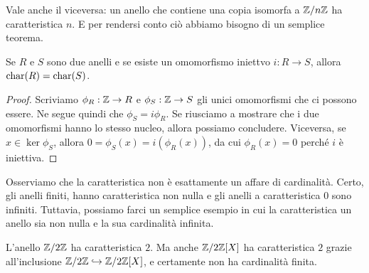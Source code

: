
Vale anche il viceversa: un anello che contiene una copia isomorfa a $\mathbb{Z}/n\mathbb{Z}$ ha caratteristica $n$. E per rendersi conto ciò abbiamo bisogno di un semplice teorema.


\begin{prop}\label{prop:ConservazioneCaratteristica}
Se $R$ e $S$ sono due anelli e se esiste un omomorfismo iniettvo $i : R \to S$, allora $\mathrm{char}(R)=\mathrm{char}(S)$.
\end{prop}

\begin{proof}
Scriviamo $\phi_R : \mathbb{Z} \to R$ e $\phi_S : \mathbb{Z} \to S$ gli unici omomorfismi che ci possono essere. Ne segue quindi che $\phi_S = i \phi_R$. Se riusciamo a mostrare che i due omomorfismi hanno lo stesso nucleo, allora possiamo concludere. Viceversa, se $x \in \ker \phi_S$, allora $0 = \phi_S(x) = i\left(\phi_R(x)\right)$, da cui $\phi_R(x) = 0$ perché $i$ è iniettiva.
\end{proof}

Osserviamo che la caratteristica non è esattamente un affare di cardinalità. Certo, gli anelli finiti, hanno caratteristica non nulla e gli anelli a caratteristica $0$ sono infiniti. Tuttavia, possiamo farci un semplice esempio in cui la caratteristica un anello sia non nulla e la sua cardinalità infinita.

\begin{esem}
L'anello $\mathbb{Z}/2\mathbb{Z}$ ha caratteristica $2$. Ma anche $\mathbb{Z}/2\mathbb{Z}[X]$ ha caratteristica $2$ grazie all'inclusione $\mathbb{Z}/2\mathbb{Z} \hookrightarrow \mathbb{Z}/2\mathbb{Z}[X]$, e certamente non ha cardinalità finita.
\end{esem}

